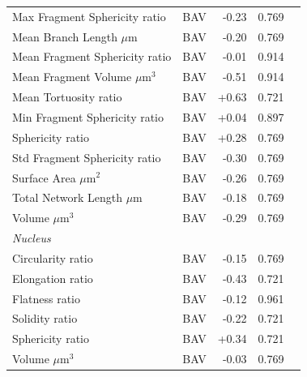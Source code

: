 \documentclass[11pt,a4paper]{article}
\begin{document}
\begin{longtable}{llrrr}
  Max Fragment Sphericity ratio & BAV & -0.23 & 0.769 &  \\
  Mean Branch Length $\mu$m & BAV & -0.20 & 0.769 &  \\
  Mean Fragment Sphericity ratio & BAV & -0.01 & 0.914 &  \\
  Mean Fragment Volume $\mu$m$^{3}$ & BAV & -0.51 & 0.914 &  \\
  Mean Tortuosity ratio & BAV & +0.63 & 0.721 &  \\
  Min Fragment Sphericity ratio & BAV & +0.04 & 0.897 &  \\
  Sphericity ratio & BAV & +0.28 & 0.769 &  \\
  Std Fragment Sphericity ratio & BAV & -0.30 & 0.769 &  \\
  Surface Area $\mu$m$^{2}$ & BAV & -0.26 & 0.769 &  \\
  Total Network Length $\mu$m & BAV & -0.18 & 0.769 &  \\
  Volume $\mu$m$^{3}$ & BAV & -0.29 & 0.769 &  \\
\midrule
\multicolumn{5}{l}{\textit{Nucleus}} \\
  Circularity ratio & BAV & -0.15 & 0.769 &  \\
  Elongation ratio & BAV & -0.43 & 0.721 &  \\
  Flatness ratio & BAV & -0.12 & 0.961 &  \\
  Solidity ratio & BAV & -0.22 & 0.721 &  \\
  Sphericity ratio & BAV & +0.34 & 0.721 &  \\
  Volume $\mu$m$^{3}$ & BAV & -0.03 & 0.769 &  \\
\bottomrule
\end{longtable}
\end{document}
